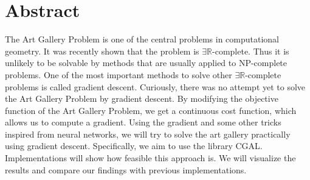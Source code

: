 \section*{Abstract}


The Art Gallery Problem is one of the central problems in computational geometry. It was recently shown that the problem is $\exists \mathbb{R}$-complete. Thus it is unlikely to be solvable by methods that are usually applied to NP-complete problems. One of the most important methods to solve other $\exists \mathbb{R}$-complete problems is called gradient descent. Curiously, there was no attempt yet to solve the Art Gallery Problem by gradient descent. By modifying the objective function of the Art Gallery Problem, we get a continuous cost function, which allows us to compute a gradient. Using the gradient and some other tricks inspired from neural networks, we will try to solve the art gallery practically using gradient descent. Specifically, we aim to use the library CGAL. 
Implementations will show how feasible this approach is. We will visualize the results and compare our findings with previous implementations.